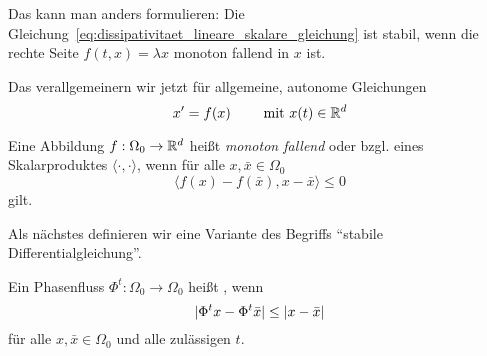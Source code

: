 Das kann man anders formulieren: Die Gleichung~\eqref{eq:dissipativitaet_lineare_skalare_gleichung} ist stabil,
wenn die rechte Seite $f(t,x) = \lambda x$ monoton fallend in $x$ ist.

Das verallgemeinern wir jetzt für allgemeine, autonome Gleichungen
\begin{equation*}
	x'=f(x)\qquad\text{ mit } x(t)\in\mathbb R^d
\end{equation*}

\begin{definition}
	Eine Abbildung $f:\Omega_0\to \mathbb R^d$ heißt \emph{monoton fallend} oder  bzgl. eines Skalarproduktes $\langle\cdot,\cdot\rangle$, wenn für alle $x,\bar x\in\Omega_0$
	\begin{equation*}
		\langle f(x)-f(\bar{x}),x-\bar x\rangle \leq 0
	\end{equation*}
	gilt.
\end{definition}

Als nächstes definieren wir eine Variante des Begriffs \enquote{stabile Differentialgleichung}.

\begin{definition}
	Ein Phasenfluss $\Phi^t:\Omega_0\to\Omega_0$ heißt , wenn
	\begin{equation*}
		\lvert \Phi^tx-\Phi^t\bar x \rvert \leq \lvert x-\bar x \rvert
	\end{equation*}
	für alle $x,\bar{x}\in\Omega_0$ und alle zulässigen $t$.
\end{definition}

